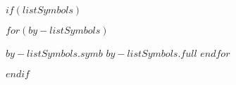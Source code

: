 \frontmatter

\buildFrontPages





$if(listSymbols)$
\begin{listSymbols}
$for(by-listSymbols)$
  \item[$by-listSymbols.symb$] $by-listSymbols.full$
$endfor$
\end{listSymbols}
$endif$

\mainmatter
